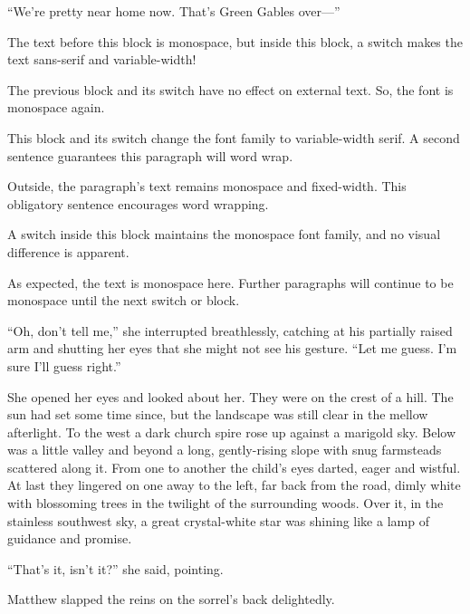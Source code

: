 \documentclass[a4paper]{article}
\begin{document}
``We're pretty near home now. That's Green Gables over---''

{\sffamily The text before this block is monospace, but inside this block, a switch makes the text sans-serif and variable-width!}

The previous block and its switch have no effect on external text. So, the font is monospace again.

{\rmfamily This block and its switch change the font family to variable-width serif. A second sentence guarantees this paragraph will word wrap.}

Outside, the paragraph's text remains monospace and fixed-width. This obligatory sentence encourages word wrapping.

{\ttfamily A switch inside this block maintains the monospace font family, and no visual difference is apparent.}

As expected, the text is monospace here. Further paragraphs will continue to be monospace until the next switch or block.

{\sffamily``Oh, don't tell me,'' she interrupted breathlessly, catching at his partially raised arm and shutting her eyes that she might not see his gesture. ``Let me guess. I'm sure I'll guess right.''

She opened her eyes and looked about her. They were on the crest of a hill. The sun had set some time since, but the landscape was still clear in the mellow afterlight. To the west a dark church spire rose up against a marigold sky. Below was a little valley and beyond a long, gently-rising slope with snug farmsteads scattered along it. From one to another the child's eyes darted, eager and wistful. At last they lingered on one away to the left, far back from the road, dimly white with blossoming trees in the twilight of the surrounding woods. Over it, in the stainless southwest sky, a great crystal-white star was shining like a lamp of guidance and promise.}

``That's it, isn't it?'' she said, pointing.

Matthew slapped the reins on the sorrel's back delightedly.
\end{document}
